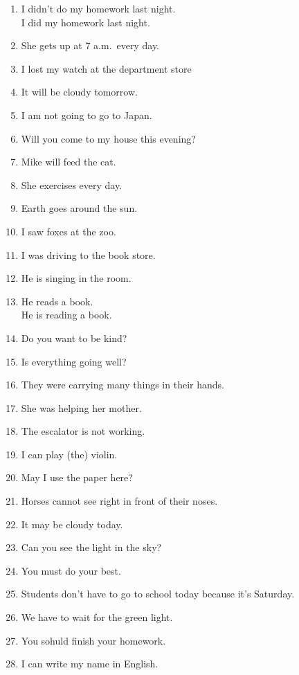 \documentclass[9pt, a4paper,  landscape]{oblivoir}
\begin{document}
\begin{enumerate}
        \item I didn't do my homework last night. \\ I did my homework last night. 
        \item She gets up at 7 a.m.~every day.
        \item I lost my watch at the department store
        \item It will be cloudy tomorrow.
        \item I am not going to go to Japan. 
        \item Will you come to my house this evening?
        \item Mike will feed the cat. 
        \item She exercises every day.
        \item Earth goes around the sun. 
        \item I saw foxes at the zoo.
        \item I was driving to the book store. 
        \item He is singing in the room. 
        \item He reads a book. \\ He is reading a book. 
        \item Do you want to be kind? 
        \item Is everything going well? 
        \item They were carrying many things in their hands. 
        \item She was helping her mother. 
        \item The escalator is not working. 
        \item I can play (the) violin.
        \item May I use the paper here? 
        \item Horses cannot see right in front of their noses. 
        \item It may be cloudy today. 
        \item Can you see the light in the sky? 
        \item You must do your best. 
        \item Students don't have to go to school today because it's Saturday.
        \item We have to wait for the green light.
        \item You sohuld finish your homework.
        \item I can write my name in English. 

\end{enumerate}
\end{document}

